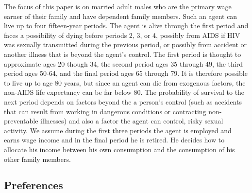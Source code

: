 \documentclass[12pt]{article}
\begin{document}
The focus of this paper is on married adult males who are the primary wage earner of their family and have dependent family members.  Such an agent can live up to four fifteen-year periods.  The agent is alive through the first period and faces a possibility of dying before periods 2, 3, or 4, possibly from AIDS if HIV was sexually transmitted during the previous period, or possibly from accident or another illness that is beyond the agent's control.  The first period is thought to approximate ages 20 though 34, the second period ages 35 through 49, the third period ages 50-64, and the final period ages 65 through 79.  It is therefore possible to live up to age 80 years, but since an agent can die from exogenous factors, the non-AIDS life expectancy can be far below 80.  The probability of survival to the next period depends on factors beyond the a person's control (such as accidents that can result from working in dangerous conditions or contracting non-preventable illnesses) and also a factor the agent can control, risky sexual activity.   We assume during the first three periods the agent is employed and earns wage income and in the final period he is retired.  He decides how to allocate his income between his own consumption and the consumption of his other family members.

\subsection{Preferences}
\end{document}
